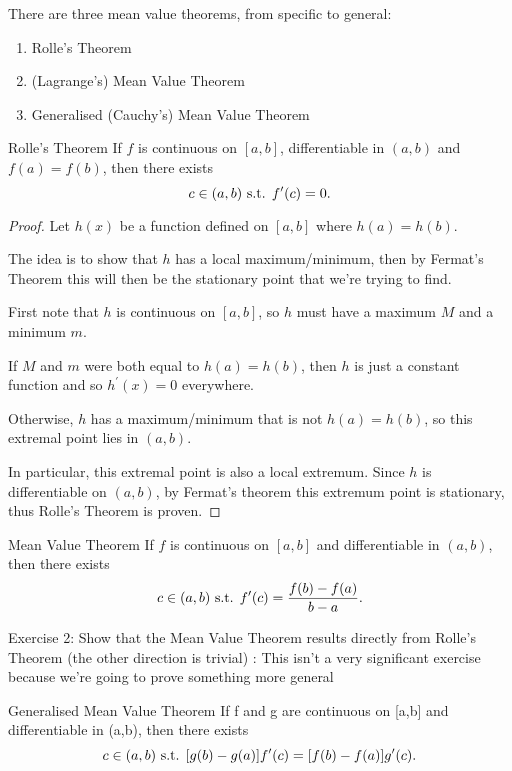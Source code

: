 There are three mean value theorems, from specific to general:
\begin{enumerate}
\item Rolle's Theorem
\item (Lagrange's) Mean Value Theorem
\item Generalised (Cauchy's) Mean Value Theorem
\end{enumerate}

\begin{thrm}{Rolle's Theorem}{}
If $f$ is continuous on $[a,b]$, differentiable in $(a,b)$ and $f(a)=f(b)$, then there exists \[ c\in(a,b) \text{ s.t. } f^\prime(c)=0. \]
\end{thrm}

\begin{proof}
Let $h(x)$ be a function defined on $[a,b]$ where $h(a)=h(b)$.

The idea is to show that $h$ has a local maximum/minimum, then by Fermat's Theorem this will then be the stationary point that we're trying to find.

First note that $h$ is continuous on $[a,b]$, so $h$ must have a maximum $M$ and a minimum $m$.

If $M$ and $m$ were both equal to $h(a)=h(b)$, then $h$ is just a constant function and so $h^\prime(x)=0$ everywhere.

Otherwise, $h$ has a maximum/minimum that is not $h(a)=h(b)$, so this extremal point lies in $(a,b)$.

In particular, this extremal point is also a local extremum.
Since $h$ is differentiable on $(a,b)$, by Fermat's theorem this extremum point is stationary, thus Rolle's Theorem is proven.
\end{proof}

\begin{defn}{Mean Value Theorem}{}
If $f$ is continuous on $[a,b]$ and differentiable in $(a,b)$, then there exists \[ c\in(a,b) \text{ s.t. } f^\prime(c)=\frac{f(b)-f(a)}{b-a}. \]
\end{defn}

Exercise 2: Show that the Mean Value Theorem results directly from Rolle's Theorem (the other direction is trivial)
:
This isn't a very significant exercise because we're going to prove something more general

\begin{thrm}{Generalised Mean Value Theorem}{}
If f and g are continuous on [a,b] and differentiable in (a,b), then there exists \[ c\in(a,b) \text{ s.t. } [g(b)-g(a)]f^\prime(c)=[f(b)-f(a)]g^\prime(c). \]
\end{thrm}



